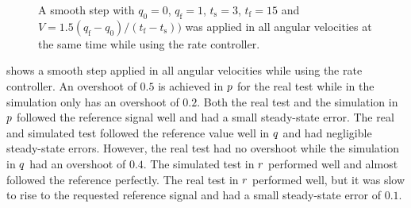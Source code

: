 \begin{figure}
\centering
  \qquad 
  \qquad
  \qquad
  \qquad
  \qquad
  \caption{\label{fig:StepAllRate}%
  A smooth step with $q_{\text{0}} = 0$, $q_{\text{f}} = 1$, $t_{\text{s}} = 3$, $t_{\text{f}} = 15$ and $V = 1.5 (q_{\text{f}} - q_{\text{0}})/(t_{\text{f}} - t_{\text{s}}))$ was applied in all angular velocities at the same time while using the rate controller.}
\end{figure}

 shows a smooth step applied in all angular velocities while using the rate controller. An overshoot of $0.5$ is achieved in $p$ for the real test while in the simulation only has an overshoot of $0.2$. Both the real test and the simulation in $p$ followed the reference signal well and had a small steady-state error. The real and simulated test followed the reference value well in $q$ and had negligible steady-state errors. However, the real test had no overshoot while the simulation in $q$ had an overshoot of $0.4$. The simulated test in $r$ performed well and almost followed the reference perfectly. The real test in $r$ performed well, but it was slow to rise to the requested reference signal and had a small steady-state error of $0.1$. 

